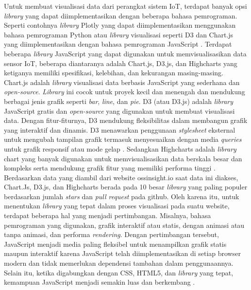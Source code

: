 Untuk membuat visualisasi data dari perangkat sistem IoT, terdapat banyak opsi \textit{library} yang dapat diimplementasikan dengan beberapa bahasa pemrograman. Seperti contohnya \textit{library} Plotly yang dapat diimplementasikan menggunakan bahasa pemrograman Python \cite{Bostrm2022} atau \textit{library} visualisasi seperti D3 dan Chart.js yang diimplementasikan dengan bahasa pemrograman JavaScript \cite{Persson2021}. Terdapat beberapa \textit{library} JavaScript yang dapat digunakan untuk memvisualisasikan data sensor IoT, beberapa diantaranya adalah Chart.js, D3.js, dan Highcharts yang ketiganya memiliki spesifikasi, kelebihan, dan kekurangan masing-masing. Chart.js adalah \textit{library} visualisasi data berbasis JavaScript yang sederhana dan \textit{open-source}. \textit{Library} ini cocok untuk proyek kecil dan menengah dan mendukung berbagai jenis grafik seperti \textit{bar}, \textit{line}, dan \textit{pie}\cite{ChartJs}. D3 (atau D3.js) adalah \textit{library} JavaScript gratis dan \textit{open-source} yang digunakan untuk membuat visualisasi data. Dengan fitur-fiturnya, D3 mendukung fleksibilitas dalam membangun grafik yang interaktif dan dinamis. D3 menawarkan penggunaan \textit{stylesheet} eksternal untuk mengubah tampilan grafik termasuk menyesuaikan dengan media \textit{queries} untuk grafik responsif atau mode gelap \cite{D3}. Sedangkan Highcharts adalah \textit{library} chart yang banyak digunakan untuk memvisualisasikan data berskala besar dan kompleks serta mendukung grafik fitur yang memiliki performa tinggi \cite{D3}. Berdasarkan data yang diambil dari website ossinsight.io saat data ini diakses, Chart.Js, D3.js, dan Highcharts berada pada 10 besar \textit{library} yang paling populer berdasarkan jumlah \textit{stars} dan \textit{pull request} pada github\cite{ossinsight}.
Oleh karena itu, untuk menentukan \textit{library} yang tepat dalam proses visualisasi pada suatu website, terdapat beberapa hal yang menjadi pertimbangan. Misalnya, bahasa pemrograman yang digunakan, grafik interaktif atau statis, dengan animasi atau tanpa animasi, dan performa \textit{rendering}. Dengan pertimbangan tersebut, JavaScript menjadi media paling fleksibel untuk menampilkan grafik statis maupun interaktif karena JavaScript telah diimplementasikan di setiap browser modern dan tidak memerlukan dependensi tambahan dalam penggunaannya. Selain itu, ketika digabungkan dengan CSS, HTML5, dan \textit{library} yang tepat, kemampuan JavaScript menjadi semakin luas dan berkembang \cite{Persson2021} \cite{Renear2010}.

